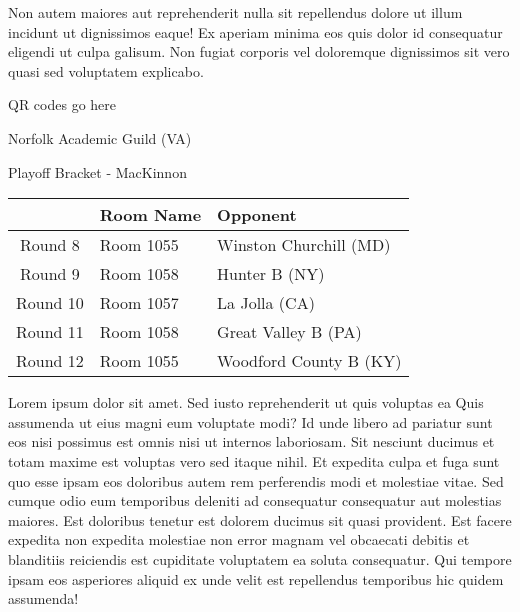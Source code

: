 \documentclass{article}%
\begin{document}
\newline%
Non autem maiores aut reprehenderit nulla sit repellendus dolore ut illum incidunt ut dignissimos eaque! Ex aperiam minima eos quis dolor id consequatur eligendi ut culpa galisum. Non fugiat corporis vel doloremque dignissimos sit vero quasi sed voluptatem explicabo.\newline%
\newline%
%
\vspace*{30pt}%
\begin{center}%
\begin{Huge}%
QR codes go here%
\end{Huge}%
\end{center}%
\newpage%
\begin{center}%
\begin{Huge}%
Norfolk Academic Guild (VA)%
\end{Huge}%
\vspace*{8pt}%
\linebreak%
\begin{Large}%
Playoff Bracket {-} MacKinnon%
\end{Large}%
\end{center}%
\begin{tabularx}{\textwidth}{|c|Y|Y|}%
\hline%
&Room Name&Opponent\\%
\hline%
Round 8&Room 1055&Winston Churchill (MD)\\%
Round 9&Room 1058&Hunter B (NY)\\%
Round 10&Room 1057&La Jolla (CA)\\%
Round 11&Room 1058&Great Valley B (PA)\\%
Round 12&Room 1055&Woodford County B (KY)\\%
\hline%
\end{tabularx}%
\vspace*{8pt}%
\linebreak%
\newline%
\newline%
Lorem ipsum dolor sit amet. Sed iusto reprehenderit ut quis voluptas ea Quis assumenda ut eius magni eum voluptate modi? Id unde libero ad pariatur sunt eos nisi possimus est omnis nisi ut internos laboriosam. Sit nesciunt ducimus et totam maxime est voluptas vero sed itaque nihil. Et expedita culpa et fuga sunt quo esse ipsam eos doloribus autem rem perferendis modi et molestiae vitae.\newline%
\newline%
Sed cumque odio eum temporibus deleniti ad consequatur consequatur aut molestias maiores. Est doloribus tenetur est dolorem ducimus sit quasi provident. Est facere expedita non expedita molestiae non error magnam vel obcaecati debitis et blanditiis reiciendis est cupiditate voluptatem ea soluta consequatur. Qui tempore ipsam eos asperiores aliquid ex unde velit est repellendus temporibus hic quidem assumenda!\newline%
\end{document}
